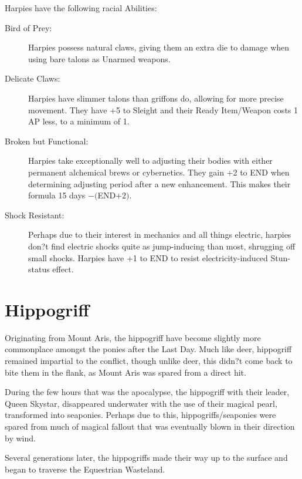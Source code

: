 \documentclass[11pt,a4paper,twocolumn]{book}
\begin{document}
	Harpies have the following racial Abilities:
	\begin{description}
		\item[Bird of Prey:] Harpies possess natural claws, giving them an extra die to damage when using bare talons as Unarmed weapons.
		\item[Delicate Claws:] Harpies have slimmer talons than griffons do, allowing for more precise movement. They have +5 to Sleight and their Ready Item/Weapon costs 1 AP less, to a minimum of 1.
		\item[Broken but Functional:] Harpies take exceptionally well to adjusting their bodies with either permanent alchemical brews or cybernetics. They gain +2 to END when determining adjusting period after a new enhancement. This makes their formula 15 days $- ($END$+2)$.
		\item[Shock Resistant:] Perhaps due to their interest in mechanics and all things electric, harpies don?t find electric shocks quite as jump-inducing than most, shrugging off small shocks. Harpies have +1 to END to resist electricity-induced Stun-status effect.
	\end{description}
	
	\clearpage
	
	\section*{Hippogriff}
	
	Originating from Mount Aris, the hippogriff have become slightly more commonplace amongst the ponies after the Last Day. Much like deer, hippogriff remained impartial to the conflict, though unlike deer, this didn?t come back to bite them in the flank, as Mount Aris was spared from a direct hit.
	
	During the few hours that was the apocalypse, the hippogriff with their leader, Queen Skystar, disappeared underwater with the use of their magical pearl, transformed into seaponies. Perhaps due to this, hippogriffs/seaponies were spared from much of magical fallout that was eventually blown in their direction by wind. 
	
	Several generations later, the hippogriffs made their way up to the surface and began to traverse the Equestrian Wasteland.
	
\end{document}
